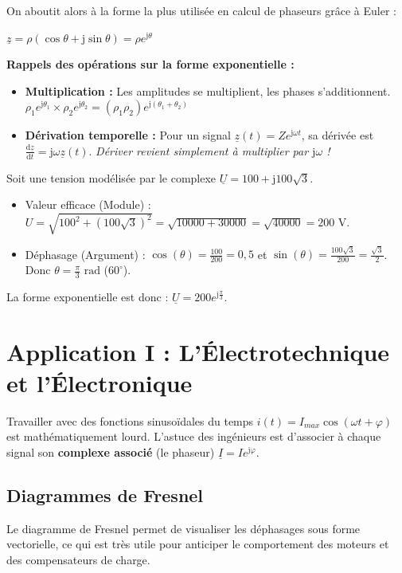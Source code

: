 \documentclass[11pt,a4paper]{article}
\newcommand{\jc}{\mathrm{j}} %
\newcommand{\cpx}[1]{\underline{#1}} %
\newcommand{\deriv}[2]{\frac{\mathrm{d}#1}{\mathrm{d}#2}} %
\begin{document}
On aboutit alors à la forme la plus utilisée en calcul de phaseurs grâce à Euler :
\begin{center}
    \Large $\cpx{z} = \rho \left( \cos\theta + \jc \sin\theta \right) = \rho e^{\jc \theta}$
\end{center}

\textbf{Rappels des opérations sur la forme exponentielle :}
\begin{itemize}
    \item \textbf{Multiplication :} Les amplitudes se multiplient, les phases s'additionnent. \\ $\rho_1 e^{\jc \theta_1} \times \rho_2 e^{\jc \theta_2} = (\rho_1 \rho_2) e^{\jc (\theta_1 + \theta_2)}$
    \item \textbf{Dérivation temporelle :} Pour un signal $\cpx{z}(t) = Z e^{\jc \omega t}$, sa dérivée est $\deriv{\cpx{z}}{t} = \jc \omega \cpx{z}(t)$. \textit{Dériver revient simplement à multiplier par $\jc\omega$ !}
\end{itemize}

\begin{exemple}
Soit une tension modélisée par le complexe $\cpx{U} = 100 + \jc 100\sqrt{3}$.
\begin{itemize}
    \item Valeur efficace (Module) : $U = \sqrt{100^2 + (100\sqrt{3})^2} = \sqrt{10000 + 30000} = \sqrt{40000} = 200\text{ V}$.
    \item Déphasage (Argument) : $\cos(\theta) = \frac{100}{200} = 0,5$ et $\sin(\theta) = \frac{100\sqrt{3}}{200} = \frac{\sqrt{3}}{2}$. Donc $\theta = \frac{\pi}{3}\text{ rad}$ ($60^\circ$).
\end{itemize}
La forme exponentielle est donc : $\cpx{U} = 200 e^{\jc \frac{\pi}{3}}$.
\end{exemple}

\section{Application I : L'Électrotechnique et l'Électronique}

Travailler avec des fonctions sinusoïdales du temps $i(t) = I_{max} \cos(\omega t + \varphi)$ est mathématiquement lourd. L'astuce des ingénieurs est d'associer à chaque signal son \textbf{complexe associé} (le phaseur) $\cpx{I} = I e^{\jc\varphi}$.

\subsection{Diagrammes de Fresnel}
Le diagramme de Fresnel permet de visualiser les déphasages sous forme vectorielle, ce qui est très utile pour anticiper le comportement des moteurs et des compensateurs de charge.
\end{document}
